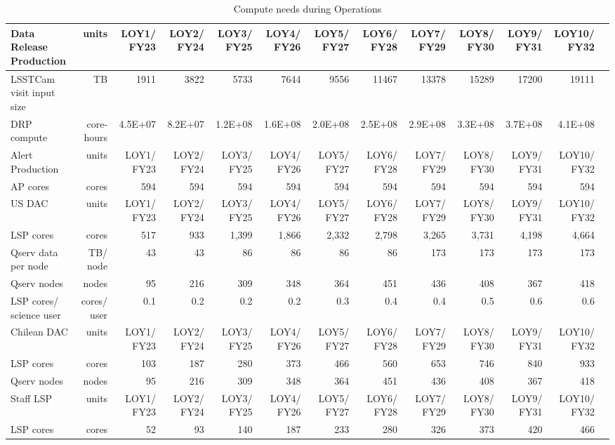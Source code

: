 \tiny \begin{longtable} { |p{}  |r  |r  |r  |r  |r  |r  |r  |r  |r  |r  |r  |r |} 
\caption{Compute needs during Operations \label{tab:computeSizingOps}}\\ 
\hline 
\textbf{Data Release Production}&\textbf{units}&\textbf{LOY1/ FY23}&\textbf{LOY2/ FY24}&\textbf{LOY3/ FY25}&\textbf{LOY4/ FY26}&\textbf{LOY5/ FY27}&\textbf{LOY6/ FY28}&\textbf{LOY7/ FY29}&\textbf{LOY8/ FY30}&\textbf{LOY9/ FY31}&\textbf{LOY10/ FY32} \\ \hline
{LSSTCam visit input size}&{TB}&{1911}&{3822}&{5733}&{7644}&{9556}&{11467}&{13378}&{15289}&{17200}&{19111} \\ \hline
{DRP compute}&{core-hours}&{4.5E+07}&{8.2E+07}&{1.2E+08}&{1.6E+08}&{2.0E+08}&{2.5E+08}&{2.9E+08}&{3.3E+08}&{3.7E+08}&{4.1E+08} \\ \hline
{Alert Production}&{units}&{LOY1/ FY23}&{LOY2/ FY24}&{LOY3/ FY25}&{LOY4/ FY26}&{LOY5/ FY27}&{LOY6/ FY28}&{LOY7/ FY29}&{LOY8/ FY30}&{LOY9/ FY31}&{LOY10/ FY32} \\ \hline
{AP cores}&{cores}&{594}&{594}&{594}&{594}&{594}&{594}&{594}&{594}&{594}&{594} \\ \hline
{US DAC}&{units}&{LOY1/ FY23}&{LOY2/ FY24}&{LOY3/ FY25}&{LOY4/ FY26}&{LOY5/ FY27}&{LOY6/ FY28}&{LOY7/ FY29}&{LOY8/ FY30}&{LOY9/ FY31}&{LOY10/ FY32} \\ \hline
{LSP cores}&{cores}&{517}&{933}&{1,399}&{1,866}&{2,332}&{2,798}&{3,265}&{3,731}&{4,198}&{4,664} \\ \hline
{Qserv data per node}&{TB/ node}&{43}&{43}&{86}&{86}&{86}&{86}&{173}&{173}&{173}&{173} \\ \hline
{Qserv nodes}&{nodes}&{95}&{216}&{309}&{348}&{364}&{451}&{436}&{408}&{367}&{418} \\ \hline
{LSP cores/ science user}&{cores/ user}&{0.1}&{0.2}&{0.2}&{0.2}&{0.3}&{0.4}&{0.4}&{0.5}&{0.6}&{0.6} \\ \hline
{Chilean DAC}&{units}&{LOY1/ FY23}&{LOY2/ FY24}&{LOY3/ FY25}&{LOY4/ FY26}&{LOY5/ FY27}&{LOY6/ FY28}&{LOY7/ FY29}&{LOY8/ FY30}&{LOY9/ FY31}&{LOY10/ FY32} \\ \hline
{LSP cores}&{cores}&{103}&{187}&{280}&{373}&{466}&{560}&{653}&{746}&{840}&{933} \\ \hline
{Qserv nodes}&{nodes}&{95}&{216}&{309}&{348}&{364}&{451}&{436}&{408}&{367}&{418} \\ \hline
{Staff LSP}&{units}&{LOY1/ FY23}&{LOY2/ FY24}&{LOY3/ FY25}&{LOY4/ FY26}&{LOY5/ FY27}&{LOY6/ FY28}&{LOY7/ FY29}&{LOY8/ FY30}&{LOY9/ FY31}&{LOY10/ FY32} \\ \hline
{LSP cores}&{cores}&{52}&{93}&{140}&{187}&{233}&{280}&{326}&{373}&{420}&{466} \\ \hline
\end{longtable} \normalsize
